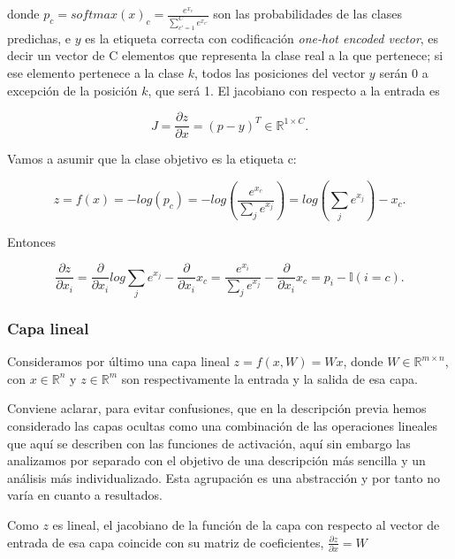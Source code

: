 donde $p_c=softmax(x)_c= \frac{e^{x_c}}{\sum_{c'=1}^C e^{x_{c'}}}$ son las probabilidades de las clases predichas, e $y$ es la etiqueta correcta con codificación \textit{one-hot encoded vector}, es decir un vector de C elementos que representa la clase real a la que pertenece; si ese elemento pertenece a la clase $k$, todos las posiciones del vector $y$ serán 0 a excepción de la posición $k$, que será 1. El jacobiano con respecto a la entrada es

$$J= \frac{\partial z}{\partial x}= (p-y)^T \in \mathbb{R}^{1\times C}.$$

Vamos a asumir que la clase objetivo es la etiqueta c:

$$z=f(x)=-log(p_c)=-log \left (\frac{e^{x_c}}{\sum_j e^{x_j}} \right ) = log \left ( \sum_j e^{x_j} \right ) - x_c.$$

Entonces

$$\frac{\partial z}{\partial x_i} = \frac{\partial}{\partial x_i} log \sum_j e^{x_j} - \frac{\partial}{\partial x_i}x_c = \frac{e^{x_i}}{\sum_j e^{x_j}} - \frac{\partial}{\partial x_i}x_c = p_i - \mathbb{I}(i=c).$$

\subsubsection{Capa lineal}

Consideramos por último una capa lineal $z=f(x,W)=Wx$, donde $W \in \mathbb{R}^{m \times n}$, con $x \in \mathbb{R}^n$ y $z \in \mathbb{R}^m$ son respectivamente la entrada y la salida de esa capa.

Conviene aclarar, para evitar confusiones, que en la descripción previa hemos considerado las capas ocultas como una combinación de las operaciones lineales que aquí se describen con las funciones de activación, aquí sin embargo las analizamos por separado con el objetivo de una descripción más sencilla y un análisis más individualizado. Esta agrupación es una abstracción y por tanto no varía en cuanto a resultados.


Como $z$ es lineal, el jacobiano de la función de la capa con respecto al vector de entrada de esa capa coincide con su matriz de coeficientes, $\frac{\partial z}{\partial x}=W$




